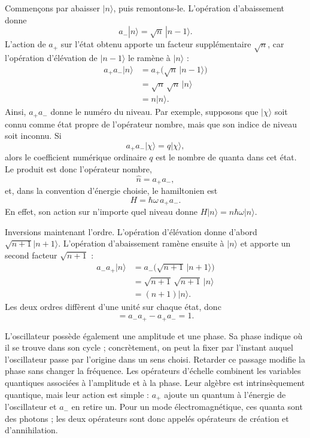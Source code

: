 Commençons par abaisser \(|n\rangle\), puis remontons-le. L’opération d’abaissement donne
\begin{equation}
a_-|n\rangle=\sqrt n\,|n-1\rangle.
\end{equation}
L’action de \(a_+\) sur l’état obtenu apporte un facteur supplémentaire \(\sqrt n\), car l’opération d’élévation de \(|n-1\rangle\) le ramène à \(|n\rangle\) :
\begin{align}
a_+a_-|n\rangle
&=a_+\bigl(\sqrt n\,|n-1\rangle\bigr)\\
&=\sqrt n\,\sqrt n\,|n\rangle\\
&=n|n\rangle.
\end{align}
Ainsi, \(a_+a_-\) donne le numéro du niveau. Par exemple, supposons que \(|\chi\rangle\) soit connu comme état propre de l’opérateur nombre, mais que son indice de niveau soit inconnu. Si
\begin{equation}
a_+a_-|\chi\rangle=q|\chi\rangle,
\end{equation}
alors le coefficient numérique ordinaire \(q\) est le nombre de quanta dans cet état. Le produit est donc l’opérateur nombre,
\begin{equation}
\hat n=a_+a_-,
\end{equation}
et, dans la convention d’énergie choisie, le hamiltonien est
\begin{equation}
H=\hbar\omega\,a_+a_-.
\end{equation}
En effet, son action sur n’importe quel niveau donne \(H|n\rangle=n\hbar\omega|n\rangle\).

Inversions maintenant l’ordre. L’opération d’élévation donne d’abord \(\sqrt{n+1}|n+1\rangle\). L’opération d’abaissement ramène ensuite à \(|n\rangle\) et apporte un second facteur \(\sqrt{n+1}\) :
\begin{align}
a_-a_+|n\rangle
&=a_-\bigl(\sqrt{n+1}\,|n+1\rangle\bigr)\\
&=\sqrt{n+1}\,\sqrt{n+1}\,|n\rangle\\
&=(n+1)|n\rangle.
\end{align}
Les deux ordres diffèrent d’une unité sur chaque état, donc
\begin{equation}
[a_-,a_+]=a_-a_+-a_+a_-=1.
\end{equation}

L’oscillateur possède également une amplitude et une phase. Sa phase indique où il se trouve dans son cycle ; concrètement, on peut la fixer par l’instant auquel l’oscillateur passe par l’origine dans un sens choisi. Retarder ce passage modifie la phase sans changer la fréquence. Les opérateurs d’échelle combinent les variables quantiques associées à l’amplitude et à la phase. Leur algèbre est intrinsèquement quantique, mais leur action est simple : \(a_+\) ajoute un quantum à l’énergie de l’oscillateur et \(a_-\) en retire un. Pour un mode électromagnétique, ces quanta sont des photons ; les deux opérateurs sont donc appelés opérateurs de création et d’annihilation.

